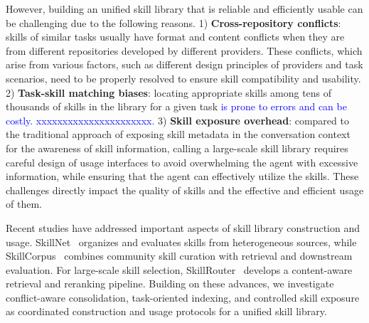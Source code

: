 \documentclass{article}
\theoremstyle{plain}
\theoremstyle{definition}
\theoremstyle{remark}
\begin{document}
However, building an unified skill library that is reliable and efficiently usable can be challenging due to the following reasons.
1) \textbf{Cross-repository conflicts}: skills of similar tasks usually have format and content conflicts when they are from different repositories developed by different providers. 
These conflicts, which arise from various factors, such as different design principles of providers and task scenarios, need to be properly resolved to ensure skill compatibility and usability.
2) \textbf{Task-skill matching biases}: locating appropriate skills among tens of thousands of skills in the library for a given task \textcolor{blue}{is prone to errors and can be costly.
xxxxxxxxxxxxxxxxxxxxxx.}
3) \textbf{Skill exposure overhead}: compared to the traditional approach of exposing skill metadata in the conversation context for the awareness of skill information, calling a large-scale skill library requires careful design of usage interfaces to avoid overwhelming the agent with excessive information, while ensuring that the agent can effectively utilize the skills.
These challenges directly impact the quality of skills and the effective and efficient usage of them. 


Recent studies have addressed important aspects of skill library construction and usage.
SkillNet~\cite{liang2026skillnet} organizes and evaluates skills from heterogeneous sources, while SkillCorpus~\cite{wang2026skillcorpus} combines community skill curation with retrieval and downstream evaluation.
For large-scale skill selection, SkillRouter~\cite{zheng2026skillrouter} develops a content-aware retrieval and reranking pipeline.
Building on these advances, we investigate conflict-aware consolidation, task-oriented indexing, and controlled skill exposure as coordinated construction and usage protocols for a unified skill library.
\end{document}
